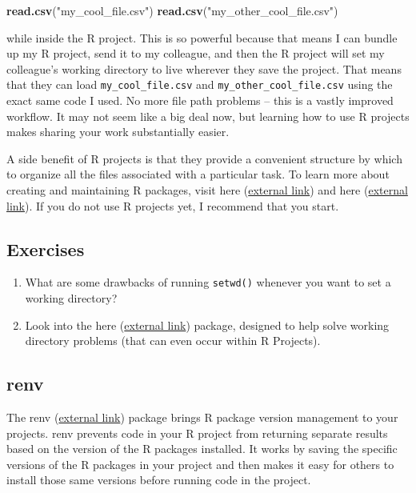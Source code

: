 \documentclass[
]{book}
\newenvironment{Shaded}{\begin{snugshade}}{\end{snugshade}}
\newcommand{\KeywordTok}[1]{\textcolor[rgb]{0.13,0.29,0.53}{\textbf{#1}}}
\newcommand{\NormalTok}[1]{#1}
\newcommand{\StringTok}[1]{\textcolor[rgb]{0.31,0.60,0.02}{#1}}
\begin{document}
\begin{Shaded}
\begin{Highlighting}[]
\KeywordTok{read.csv}\NormalTok{(}\StringTok{"my_cool_file.csv"}\NormalTok{)}
\KeywordTok{read.csv}\NormalTok{(}\StringTok{"my_other_cool_file.csv"}\NormalTok{)}
\end{Highlighting}
\end{Shaded}

while inside the R project. This is so powerful because that means I can bundle up my R project, send it to my colleague, and then the R project will set my colleague's working directory to live wherever they save the project. That means that they can load \texttt{my\_cool\_file.csv} and \texttt{my\_other\_cool\_file.csv} using the exact same code I used. No more file path problems -- this is a vastly improved workflow. It may not seem like a big deal now, but learning how to use R projects makes sharing your work substantially easier.

A side benefit of R projects is that they provide a convenient structure by which to organize all the files associated with a particular task. To learn more about creating and maintaining R packages, visit here (\href{https://r4ds.had.co.nz/workflow-projects.html}{external link}) and here (\href{https://support.rstudio.com/hc/en-us/articles/200526207-Using-Projects}{external link}). If you do not use R projects yet, I recommend that you start.

\hypertarget{ex-set11}{%
\subsection{Exercises}\label{ex-set11}}

\begin{enumerate}
\def\labelenumi{\arabic{enumi}.}
\item
  What are some drawbacks of running \texttt{setwd()} whenever you want to set a working directory?
\item
  Look into the here (\href{https://here.r-lib.org/}{external link}) package, designed to help solve working directory problems (that can even occur within R Projects).
\end{enumerate}

\hypertarget{renv}{%
\subsection{renv}\label{renv}}

The renv (\href{https://rstudio.github.io/renv/articles/renv.html}{external link}) package brings R package version management to your projects. renv prevents code in your R project from returning separate results based on the version of the R packages installed. It works by saving the specific versions of the R packages in your project and then makes it easy for others to install those same versions before running code in the project.
\end{document}
